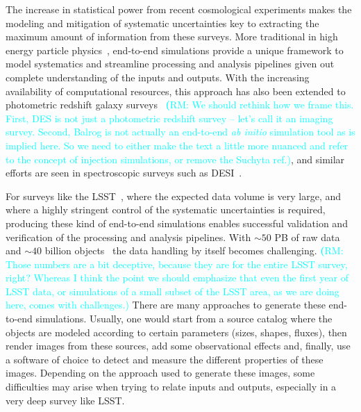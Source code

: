 \documentclass[twocolumn]{aastex62}
\newcommand{\rachel}[1]{{\textcolor{cyan}{{\textbf (RM: #1)}}}}
\begin{document}
The increase in statistical power from recent cosmological experiments makes the modeling and mitigation of systematic uncertainties key to extracting the maximum amount of information from these surveys. More traditional in high energy particle physics~\citep{Brun:118715, 2006JHEP...05..026S}, end-to-end simulations provide a unique framework to
model systematics and streamline processing and analysis pipelines given out complete understanding of the inputs and outputs. With the increasing availability of computational resources, this approach has also been extended to photometric redshift galaxy surveys~\citep{2016MNRAS.457..786S,2016ApJ...817...25B} \rachel{We should rethink how we frame this.  First, DES is not just a photometric redshift survey -- let's call it an imaging survey.  Second, Balrog is not actually an end-to-end {\em ab initio} simulation tool as is implied here.  So we need to either make the text a little more nuanced and refer to the concept of injection simulations, or remove the Suchyta ref.}, and similar efforts are seen in spectroscopic surveys such as DESI~\citep{2016arXiv161100036D}.

For surveys like the LSST~\citep{Overview}, where the expected data volume is very large, and where a highly stringent control of the systematic uncertainties is required, producing these
kind of end-to-end simulations enables successful validation and verification of the processing and
analysis pipelines. With $\sim 50$ PB of raw data and $\sim 40$ billion objects~\citep{Overview} the
data handling by itself becomes challenging. \rachel{Those numbers are a bit deceptive, because they
  are for the entire LSST survey, right?  Whereas I think the point we should emphasize that
  even the first year of LSST data, or simulations of a small subset of the LSST area, as we are doing here, comes with challenges.} There are many approaches to generate these end-to-end simulations. Usually, one would start from a source catalog where the objects are modeled according to certain parameters (sizes, shapes, fluxes), then render images from these sources, add some observational effects and, finally, use a software of choice to detect and measure the different properties of these images. Depending on the approach used to generate these images, some difficulties may arise when trying to relate inputs and outputs, especially in a very deep survey like LSST.
\end{document}
